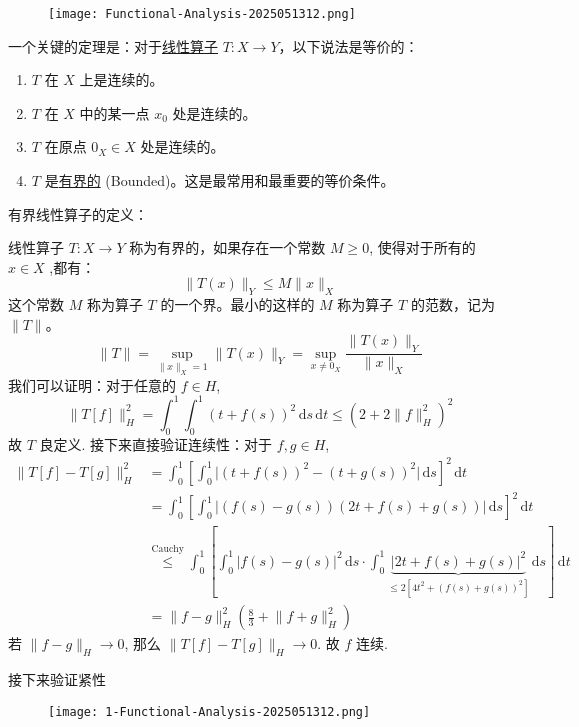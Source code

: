 \begin{exercise}[非线性算子的连续性；紧性]
\begin{figure}[H]
\centering
\texttt{[image: Functional-Analysis-2025051312.png]}
\label{}
\end{figure}
\end{exercise}
一个关键的定理是：对于\underline{线性算子} $T:X \to Y$，以下说法是等价的：

\begin{enumerate}
	\item $T$ 在 $X$ 上是连续的。
	\item $T$ 在 $X$ 中的某一点 $x_0$ 处是连续的。
	\item $T$ 在原点 $0_X \in X$ 处是连续的。
	\item $T$ 是\underline{有界的} (Bounded)。这是最常用和最重要的等价条件。
\end{enumerate}

有界线性算子的定义：

线性算子 $T:X\to Y$ 称为有界的，如果存在一个常数 $M\geq0$, 使得对于所有的 $x\in X$ ,都有：
\[
\|T(x)\|_Y\leq M\|x\|_X
\]
这个常数 $M$ 称为算子 $T$ 的一个界。最小的这样的 $M$ 称为算子 $T$ 的范数，记为 $\|T\|$。
\[
\|T\|=\sup_{\|x\|_X=1}\|T(x)\|_Y=\sup_{x\neq0_X}\frac{\|T(x)\|_Y}{\|x\|_X}
\]
我们可以证明：对于任意的 $f\in H$,
\[
\lVert T[f] \rVert _{H}^2=\int_{0}^{1} \int_{0}^{1} (t+f(s))^2 \, \mathrm{d}s  \, \mathrm{d}t\leq (2+2\lVert f \rVert _{H}^2)^2
\]
故 $T$ 良定义. 接下来直接验证连续性：对于 $f, g\in H$,
\[
\begin{aligned}
\lVert T[f]-T[g] \rVert ^2_{H} & =\int_{0}^{1} \left[ \int_{0}^{1} \lvert (t+f(s))^2-(t+g(s))^2 \rvert  \, \mathrm{d}s \right]^2 \, \mathrm{d}t \\
 & =\int_{0}^{1} \left[ \int_{0}^{1} \lvert (f(s)-g(s))(2t+f(s)+g(s)) \rvert  \, \mathrm{d}s \right]^2  \, \mathrm{d}t  \\
 & \overset{ \text{Cauchy} }{ \leq  }\int_{0}^{1} \left[ \int_{0}^{1} \lvert f(s)-g(s) \rvert ^2 \, \mathrm{d}s \cdot\int_{0}^{1} \underbrace{ \lvert 2t+f(s)+g(s) \rvert ^2 }_{ \leq 2[4t^2+(f(s)+g(s))^2] } \, \mathrm{d}s  \right] \, \mathrm{d}t \\
 & =\lVert f-g \rVert _{H}^2\left( \frac{8}{3} +\lVert f+g \rVert _{H}^2\right)
\end{aligned}
\]
若 $\lVert f-g \rVert_{H}\to0$, 那么 $\lVert T[f]-T[g] \rVert_{H}\to0$. 故 $f$ 连续.

接下来验证紧性
\begin{figure}[H]
\centering
\texttt{[image: 1-Functional-Analysis-2025051312.png]}
\label{}
\end{figure}


